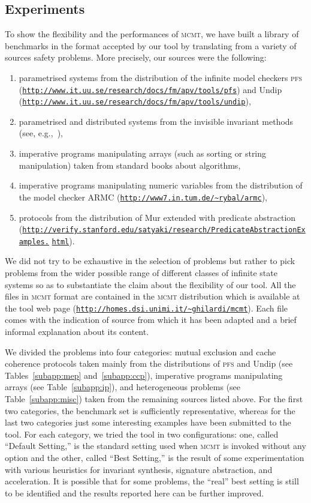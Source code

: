 \documentclass{LMCS}
\theoremstyle{plain}\newtheorem{assumption}[thm]{Assumption}
\theoremstyle{plain}\newtheorem{proposition}[thm]{Proposition}
\theoremstyle{plain}\newtheorem{property}[thm]{Property}
\theoremstyle{plain}\newtheorem{example}[thm]{Example}
\theoremstyle{plain}\newtheorem{claim}[thm]{Claim}
\theoremstyle{plain}\newtheorem{lemma}[thm]{Lemma}
\begin{document}
\subsection{Experiments}
\label{sec:exp}
To show the flexibility and the performances of \textsc{mcmt}, we have
built a library of benchmarks in the format accepted by our tool by
translating from a variety of sources safety problems.  More
precisely, our sources were the following:
\begin{enumerate}[]
\item parametrised systems from the distribution of the infinite model
  checkers \textsc{pfs}
  (\texttt{\url{http://www.it.uu.se/research/docs/fm/apv/tools/pfs}})
  and Undip
  (\texttt{\url{http://www.it.uu.se/research/docs/fm/apv/tools/undip}}),
\item parametrised and distributed systems from the invisible
  invariant methods (see, e.g.,~\cite{BFPZ05}),
\item imperative programs manipulating arrays (such as sorting or
  string manipulation) taken from standard books about algorithms,
\item imperative programs manipulating numeric variables from the
  distribution of the model checker ARMC
  (\texttt{\url{http://www7.in.tum.de/~rybal/armc}}),
\item protocols from the distribution of Mur extended with
  predicate abstraction
  (\texttt{\url{http://verify.stanford.edu/satyaki/research/PredicateAbstractionExamples.}} \linebreak \texttt{\url{html}}).
\end{enumerate}
We did not try to be exhaustive in the selection of problems but
rather to pick problems from the wider possible range of different
classes of infinite state systems so as to substantiate the claim
about the flexibility of our tool.  All the files in \textsc{mcmt}
format are contained in the \textsc{mcmt} distribution which is
available at the tool web page
(\texttt{\url{http://homes.dsi.unimi.it/~ghilardi/mcmt}}).  Each file
comes with the indication of source from which it has been adapted and
a brief informal explanation about its content.

We divided the problems into four categories: mutual exclusion and
cache coherence protocols taken mainly from the distributions of
\textsc{pfs} and Undip (see Tables~\ref{subapp:mep}
and~\ref{subapp:ccp}), imperative programs manipulating arrays (see
Table~\ref{subapp:ip}), and heterogeneous problems (see
Table~\ref{subapp:misc}) taken from the remaining sources listed
above.
For the first two categories, the benchmark set is sufficiently
representative, whereas for the last two categories just some
interesting examples have been submitted to the tool.
For each category, we tried the tool in two configurations: one,
called ``Default Setting,'' is the standard setting used when
\textsc{mcmt} is invoked without any option and the other, called
``Best Setting,'' is the result of some experimentation with various
heuristics for invariant synthesis, signature abstraction, and
acceleration.  It is possible that for some problems, the ``real''
best setting is still to be identified and the results reported here
can be further improved.
\end{document}
